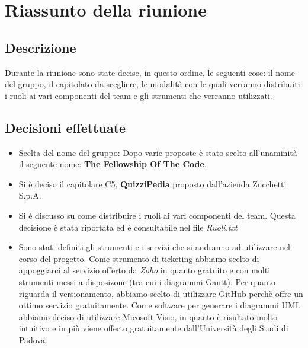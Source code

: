 \chapter{Riassunto della riunione}
\section{Descrizione}

Durante la riunione sono state decise, in questo ordine, le seguenti cose: il nome del gruppo, il capitolato da scegliere, le modalità con le quali verranno distribuiti i ruoli ai vari componenti del team e gli strumenti che verranno utilizzati.

\section{Decisioni effettuate}
\begin{itemize}
\item Scelta del nome del gruppo: Dopo varie proposte è stato scelto all'unaminità il seguente nome: \textbf{The Fellowship Of The Code}.
\item Si è deciso il capitolare C5, \textbf{QuizziPedia} proposto dall'azienda Zucchetti S.p.A.
\item Si è discusso su come distribuire i ruoli ai vari componenti del team. Questa decisione è stata riportata ed è consultabile nel file \textsl{Ruoli.txt}
\item Sono stati definiti gli strumenti e i servizi che si andranno ad utilizzare nel corso del progetto. Come strumento di ticketing abbiamo scelto di appoggiarci al servizio offerto da \textsl{Zoho} in quanto gratuito e con molti strumenti messi a disposizone (tra cui i diagrammi Gantt). Per quanto riguarda il versionamento, abbiamo scelto di utilizzare GitHub perchè offre un ottimo servizio gratuitamente. Come software per generare i diagrammi UML abbiamo deciso di utilizzare Micosoft Visio, in quanto è risultato molto intuitivo e in più viene offerto gratuitamente dall'Università degli Studi di Padova.
\end{itemize}